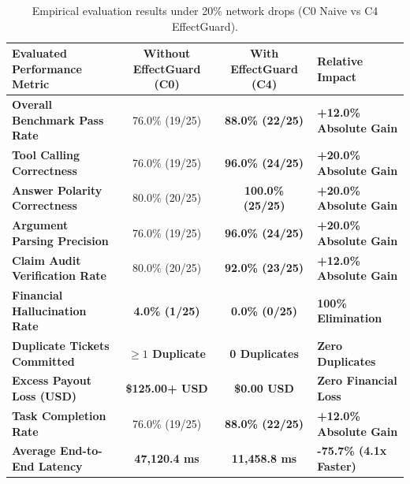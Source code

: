 \begin{table}[H]
\centering
\small
\renewcommand{\arraystretch}{1.2}
\begin{tabularx}{\textwidth}{p{5.5cm}ccp{3.2cm}}
\toprule
\textbf{Evaluated Performance Metric} & \textbf{Without EffectGuard (C0)} & \textbf{With EffectGuard (C4)} & \textbf{Relative Impact} \\
\midrule
\textbf{Overall Benchmark Pass Rate} & 76.0\% (19/25) & \textbf{88.0\% (22/25)} & \textbf{+12.0\% Absolute Gain} \\
\textbf{Tool Calling Correctness} & 76.0\% (19/25) & \textbf{96.0\% (24/25)} & \textbf{+20.0\% Absolute Gain} \\
\textbf{Answer Polarity Correctness} & 80.0\% (20/25) & \textbf{100.0\% (25/25)} & \textbf{+20.0\% Absolute Gain} \\
\textbf{Argument Parsing Precision} & 76.0\% (19/25) & \textbf{96.0\% (24/25)} & \textbf{+20.0\% Absolute Gain} \\
\textbf{Claim Audit Verification Rate} & 80.0\% (20/25) & \textbf{92.0\% (23/25)} & \textbf{+12.0\% Absolute Gain} \\
\textbf{Financial Hallucination Rate} & \textbf{4.0\% (1/25)} & \textbf{0.0\% (0/25)} & \textbf{100\% Elimination} \\
\textbf{Duplicate Tickets Committed} & \textbf{$\ge 1$ Duplicate} & \textbf{0 Duplicates} & \textbf{Zero Duplicates} \\
\textbf{Excess Payout Loss (USD)} & \textbf{\$125.00+ USD} & \textbf{\$0.00 USD} & \textbf{Zero Financial Loss} \\
\textbf{Task Completion Rate} & 76.0\% (19/25) & \textbf{88.0\% (22/25)} & \textbf{+12.0\% Absolute Gain} \\
\textbf{Average End-to-End Latency} & \textbf{47,120.4 ms} & \textbf{11,458.8 ms} & \textbf{-75.7\% (4.1x Faster)} \\
\bottomrule
\end{tabularx}
\caption{Empirical evaluation results under 20\% network drops (C0 Naive vs C4 EffectGuard).}
\label{tab:results_20pct}
\end{table}

